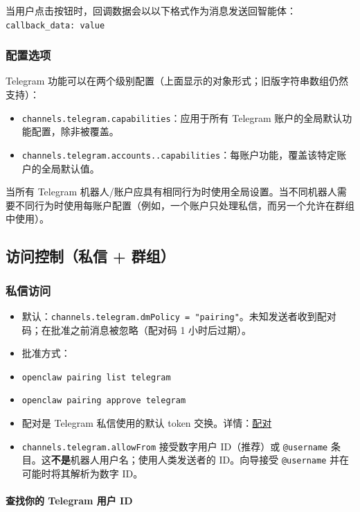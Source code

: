 当用户点击按钮时，回调数据会以以下格式作为消息发送回智能体：
\texttt{callback\_data: value}

\subsubsection{配置选项}


Telegram 功能可以在两个级别配置（上面显示的对象形式；旧版字符串数组仍然支持）：

\begin{itemize}
  \item \texttt{channels.telegram.capabilities}：应用于所有 Telegram 账户的全局默认功能配置，除非被覆盖。
  \item \texttt{channels.telegram.accounts..capabilities}：每账户功能，覆盖该特定账户的全局默认值。
\end{itemize}


当所有 Telegram 机器人/账户应具有相同行为时使用全局设置。当不同机器人需要不同行为时使用每账户配置（例如，一个账户只处理私信，而另一个允许在群组中使用）。

\subsection{访问控制（私信 + 群组）}


\subsubsection{私信访问}


\begin{itemize}
  \item 默认：\texttt{channels.telegram.dmPolicy = "pairing"}。未知发送者收到配对码；在批准之前消息被忽略（配对码 1 小时后过期）。
  \item 批准方式：
  \item \texttt{openclaw pairing list telegram}
  \item \texttt{openclaw pairing approve telegram }
  \item 配对是 Telegram 私信使用的默认 token 交换。详情：\href{/channels/pairing}{配对}
  \item \texttt{channels.telegram.allowFrom} 接受数字用户 ID（推荐）或 \texttt{@username} 条目。这\textbf{不是}机器人用户名；使用人类发送者的 ID。向导接受 \texttt{@username} 并在可能时将其解析为数字 ID。
\end{itemize}


\paragraph{查找你的 Telegram 用户 ID}


